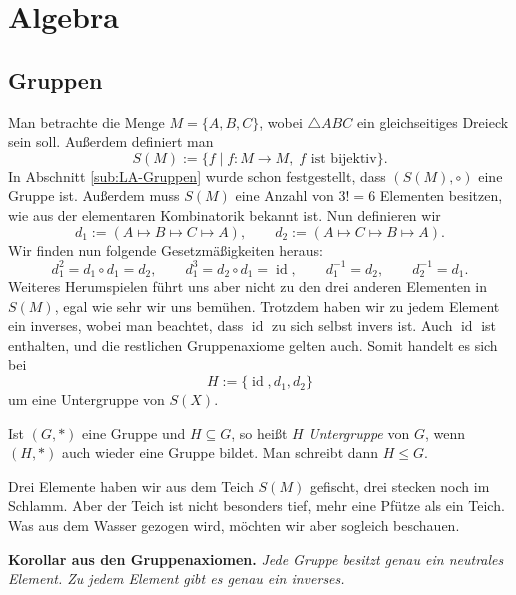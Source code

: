 \documentclass[a4paper,11pt,fleqn,twoside]{scrartcl}
\numberwithin{equation}{section}
\newcommand{\id}{\operatorname{id}}
\newcommand{\strong}[1]{{\sf\bfseries #1}}
\newenvironment{Definition}{\par\noindent\strong{Definition.}}{\par}
\begin{document}
\section{Algebra}
\subsection{Gruppen}
Man betrachte die Menge $M=\{A,B,C\}$, wobei $\triangle ABC$ ein
gleichseitiges Dreieck sein soll. Außerdem definiert man
\begin{equation}
S(M) := \{f\mid f\colon M\to M,\;\text{$f$ ist bijektiv}\}.
\end{equation}
In Abschnitt \ref{sub:LA-Gruppen} wurde schon festgestellt,
dass $(S(M),\circ)$ eine Gruppe ist. Außerdem muss $S(M)$ eine
Anzahl von $3!=6$ Elementen besitzen, wie aus der elementaren
Kombinatorik bekannt ist. Nun definieren wir
\begin{equation}
d_1 := (A \mapsto B \mapsto C\mapsto A),\qquad d_2:=(A\mapsto C\mapsto B\mapsto A).
\end{equation}
Wir finden nun folgende Gesetzmäßigkeiten heraus:
\begin{equation}
d_1^2 = d_1\circ d_1 = d_2, \qquad d_1^3 = d_2\circ d_1 = \id, \qquad d_1^{-1}=d_2,\qquad d_2^{-1}=d_1.
\end{equation}
Weiteres Herumspielen führt uns aber nicht zu den drei anderen
Elementen in $S(M)$, egal wie sehr wir uns bemühen. Trotzdem
haben wir zu jedem Element ein inverses, wobei man beachtet,
dass $\id$ zu sich selbst invers ist. Auch $\id$ ist enthalten,
und die restlichen Gruppenaxiome gelten auch. Somit handelt es sich
bei
\begin{equation}\label{eq:Drehungen}
H := \{\id,d_1,d_2\}
\end{equation}
um eine Untergruppe von $S(X)$.

\begin{Definition}
Ist $(G,*)$ eine Gruppe und $H\subseteq G$, so heißt $H$
\emph{Untergruppe} von $G$, wenn $(H,*)$ auch wieder eine Gruppe
bildet. Man schreibt dann $H\le G$.
\end{Definition}
Drei Elemente haben wir aus dem Teich $S(M)$ gefischt, drei
stecken noch im Schlamm. Aber der Teich ist nicht besonders tief,
mehr eine Pfütze als ein Teich. Was aus dem Wasser gezogen wird,
möchten wir aber sogleich beschauen.

\strong{Korollar aus den Gruppenaxiomen.} \emph{Jede Gruppe
besitzt genau ein neutrales Element. Zu jedem Element gibt
es genau ein inverses.}
\end{document}
